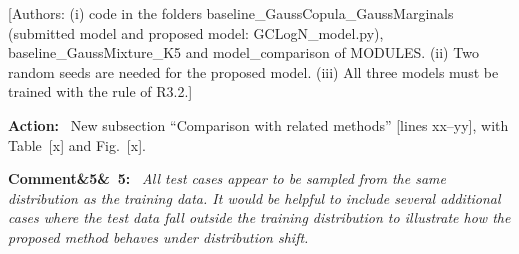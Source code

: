 \documentclass[11pt]{article}
\newenvironment{rcomment}[1]{\par\bigskip\noindent\textbf{Comment\ifx&#1&\else\ #1\fi:}\ \itshape}{\par}
\newenvironment{action}{\par\smallskip\noindent\color{resp}\textbf{Action:}\ }{\par}
\newcommand{\authornote}[1]{\textcolor{note}{\textsf{[Authors: #1]}}}
\newcommand{\tbd}[1]{\textcolor{note}{\textsf{[#1]}}}
\newcommand{\lines}[1]{\tbd{lines #1}}
\begin{document}
\authornote{(i) code in the folders baseline\_GaussCopula\_GaussMarginals (submitted model and proposed model:
GCLogN\_model.py), baseline\_GaussMixture\_K5 and model\_comparison of MODULES. (ii) Two random seeds are needed for the proposed model. (iii) All three models must be trained with the rule of R3.2.}

\begin{action}
New subsection ``Comparison with related methods'' \lines{xx--yy}, with Table~\tbd{x} and Fig.~\tbd{x}.
\end{action}

\begin{rcomment}{5}
All test cases appear to be sampled from the same distribution as the training data. It would be helpful to include
several additional cases where the test data fall outside the training distribution to illustrate how the proposed
method behaves under distribution shift.
\end{rcomment}
\end{document}
